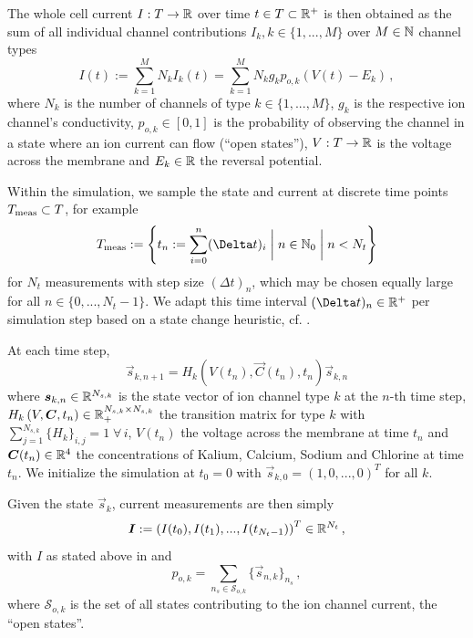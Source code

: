 \documentclass[USenglish,twocolumn]{article}
\begin{document}
  The whole cell current $I: T \rightarrow \mathbb{R}$ over time $t \in T \subset \mathbb{R}^+$ is then obtained as the sum of all individual channel contributions $I_k, k \in \{1, ..., M\}$ over $M \in \mathbb{N}$ channel types
  \begin{equation}
    I(t) := \sum_{k=1}^{M} N_k I_k(t) = \sum_{k=1}^{M} N_k g_k p_{o,k} \left(V(t)-E_k\right)\,,
    \label{eq:current}
  \end{equation}
  where $N_k$ is the number of channels of type $k \in \{1, ..., M\}$, $g_k$ is the respective ion channel's conductivity, $p_{o, k} \in [0, 1]$ is the probability of observing the channel in a state where an ion current can flow (``open states''), $V: T \rightarrow \mathbb{R}$ is the voltage across the membrane and $E_k \in \mathbb{R}$ the reversal potential.

  Within the simulation, we sample the state and current at discrete time points $T_{\rm meas} \subset T$, for example
  $$T_{\rm meas} := \left\{t_n := \sum_{i=0}^n (\Delta t)_i \;\bigg|\; n \in \N_0 \;\bigg|\; n < N_t\right\}$$
  for $N_t$ measurements with step size $(\Delta t)_n$, which may be chosen equally large for all $n \in \{0, ..., N_t - 1\}$.
  We adapt this time interval $(\Delta t)_n \in \R^+$ per simulation step based on a state change heuristic, cf. .

  At each time step,
  \begin{equation}
    \vec{s}_{k,n+1} = H_{k}\left(V(t_n), \vec{C}(t_n), t_n\right) \vec{s}_{k,n}
  \end{equation}
  where ${\bm{s}}_{k,n} \in \mathbb{R}^{N_{s,k}}$ is the state vector of ion channel type $k$ at the $n$-th time step, $H_{k}\left(V, {\bm{C}}, t_n\right) \in \mathbb{R}_+^{N_{s,k} \times N_{s,k}}$ the transition matrix for type $k$ with $\sum_{j=1}^{N_{s,k}} \{H_k\}_{i,j} = 1 \;\forall\,i$, $V(t_n)$ the voltage across the membrane at time $t_n$ and ${\bm{C}}(t_n) \in \mathbb{R}^4$ the concentrations of Kalium, Calcium, Sodium and Chlorine at time $t_n$.
  We initialize the simulation at $t_0 = 0$ with $\vec{s}_{k,0} = (1, 0, ..., 0)^T$ for all $k$.

  Given the state $\vec{s}_{k}$, current measurements are then simply
  $${\bm{I}} := \left(I(t_0), I(t_1), ..., I(t_{N_t-1})\right)^T \in \mathbb{R}^{N_t}\,,$$
  with $I$ as stated above in  and
  $$p_{o,k} = \sum_{n_s \in \mathcal{S}_{o,k}} \{\vec{s}_{n,k}\}_{n_s}\,,$$
  where $\mathcal{S}_{o,k}$ is the set of all states contributing to the ion channel current, the ``open states''.
\end{document}
